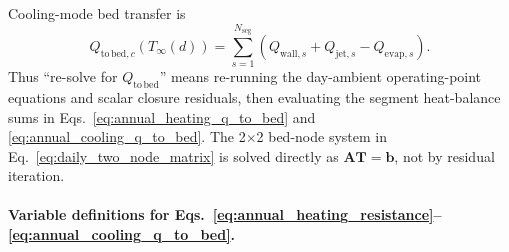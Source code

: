 \documentclass[11pt]{article}
\begin{document}
Cooling-mode bed transfer is
\begin{equation}
\label{eq:annual_cooling_q_to_bed}
Q_{\mathrm{to\,bed},c}(T_\infty(d))=
\sum_{s=1}^{N_{\mathrm{seg}}}
\left(Q_{\mathrm{wall},s}+Q_{\mathrm{jet},s}-Q_{\mathrm{evap},s}\right).
\end{equation}
Thus ``re-solve for \(Q_{\mathrm{to\,bed}}\)'' means re-running the day-ambient operating-point equations and scalar closure residuals, then evaluating the segment heat-balance sums in Eqs.~\eqref{eq:annual_heating_q_to_bed} and \eqref{eq:annual_cooling_q_to_bed}. The 2\(\times\)2 bed-node system in Eq.~\eqref{eq:daily_two_node_matrix} is solved directly as \(\mathbf{A}\mathbf{T}=\mathbf{b}\), not by residual iteration.

\paragraph{Variable definitions for Eqs.~\eqref{eq:annual_heating_resistance}--\eqref{eq:annual_cooling_q_to_bed}.}
\end{document}

